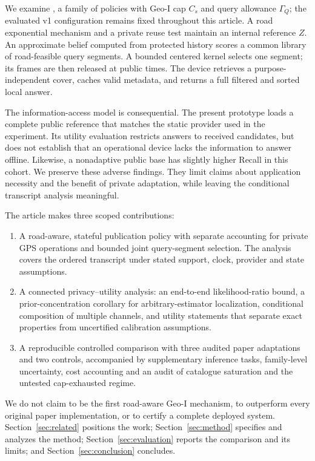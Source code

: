 We examine \BQ{}, a family of policies with Geo-I cap $C_s$ and query allowance $\Gamma_Q$;
the evaluated v1 configuration remains fixed throughout this article. A road exponential
mechanism and a private reuse test maintain an internal reference $Z$. An approximate belief
computed from protected history scores a common library of road-feasible query segments.
A bounded centered kernel selects one segment; its frames are then released at public times.
The device retrieves a purpose-independent cover, caches valid metadata, and returns a full
filtered and sorted local answer.

The information-access model is consequential. The present prototype loads a complete
public reference that matches the static provider used in the experiment. Its utility
evaluation restricts answers to received candidates, but does not establish that an
operational device lacks the information to answer offline. Likewise, a nonadaptive public
base has slightly higher Recall in this cohort. We preserve these adverse findings.
They limit claims about application necessity and the benefit of private adaptation, while
leaving the conditional transcript analysis meaningful.

The article makes three scoped contributions:
\begin{enumerate}[leftmargin=*,itemsep=3pt]
\item A road-aware, stateful publication policy with separate accounting for private GPS
operations and bounded joint query-segment selection. The analysis covers the ordered
transcript under stated support, clock, provider and state assumptions.
\item A connected privacy--utility analysis: an end-to-end likelihood-ratio bound, a
prior-concentration corollary for arbitrary-estimator localization, conditional composition
of multiple channels, and utility statements that separate exact properties from
uncertified calibration assumptions.
\item A reproducible controlled comparison with three audited paper adaptations and two
controls, accompanied by supplementary inference tasks, family-level uncertainty, cost
accounting and an audit of catalogue saturation and the untested cap-exhausted regime.
\end{enumerate}
We do not claim to be the first road-aware Geo-I mechanism, to outperform every original
paper implementation, or to certify a complete deployed system.
Section~\ref{sec:related} positions the work; Section~\ref{sec:method} specifies and analyzes
the method; Section~\ref{sec:evaluation} reports the comparison and its limits; and
Section~\ref{sec:conclusion} concludes.
